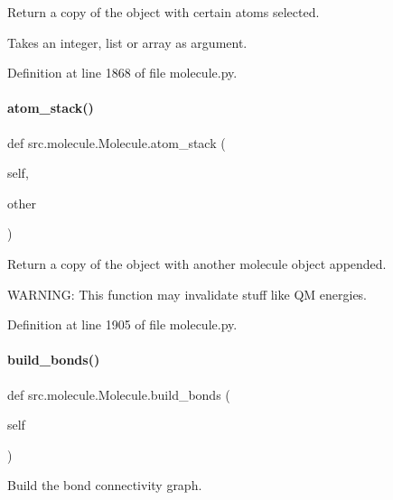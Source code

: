 Return a copy of the object with certain atoms selected. 

Takes an integer, list or array as argument. 

Definition at line 1868 of file molecule.\+py.

\mbox{\label{classsrc_1_1molecule_1_1Molecule_a06d6ebbb45f759c58b30f6c7c084c3e5}} 
\paragraph{\texorpdfstring{atom\+\_\+stack()}{atom\_stack()}}
{\footnotesize\ttfamily def src.\+molecule.\+Molecule.\+atom\+\_\+stack (\begin{DoxyParamCaption}\item[{}]{self,  }\item[{}]{other }\end{DoxyParamCaption})}



Return a copy of the object with another molecule object appended. 

W\+A\+R\+N\+I\+NG\+: This function may invalidate stuff like QM energies. 

Definition at line 1905 of file molecule.\+py.

\mbox{\label{classsrc_1_1molecule_1_1Molecule_a55418dce14e7b54da5ccfa96b0c564d4}} 
\paragraph{\texorpdfstring{build\+\_\+bonds()}{build\_bonds()}}
{\footnotesize\ttfamily def src.\+molecule.\+Molecule.\+build\+\_\+bonds (\begin{DoxyParamCaption}\item[{}]{self }\end{DoxyParamCaption})}



Build the bond connectivity graph. 



